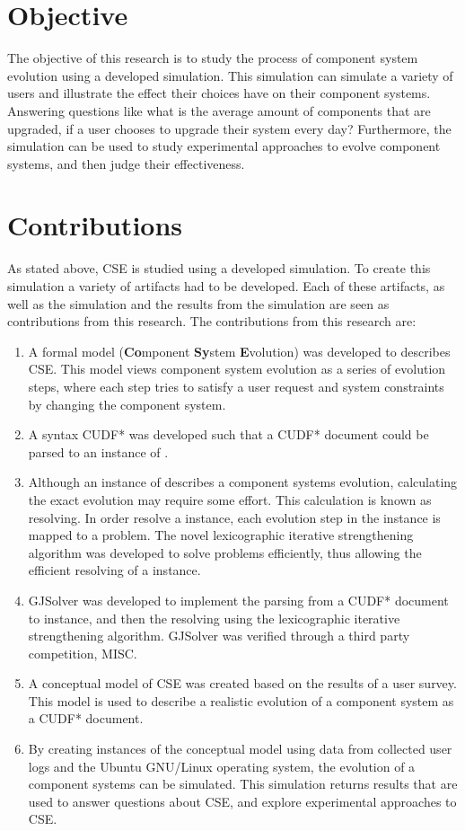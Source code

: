 \section{Objective}
The objective of this research is to study the process of component system evolution using a developed simulation.
This simulation can simulate a variety of users and illustrate the effect their choices have on their component systems.
Answering questions like what is the average amount of components that are upgraded, if a user chooses to upgrade their system every day?
Furthermore, the simulation can be used to study experimental approaches to evolve component systems, and then judge their effectiveness.

\section{Contributions}
As stated above, CSE is studied using a developed simulation.
To create this simulation a variety of artifacts had to be developed.
Each of these artifacts, as well as the simulation and the results from the simulation are seen as contributions from this research. 
The contributions from this research are:
\begin{enumerate}
  \item A formal model \modelname (\textbf{Co}mponent \textbf{Sy}stem \textbf{E}volution) was developed to describes CSE. 
  This model views component system evolution as a series of evolution steps, where each step tries to satisfy a user request and system constraints by changing the component system.
  \item A syntax CUDF* was developed such that a CUDF* document could be parsed to an instance of \modelname. 
  \item Although an instance of \modelname describes a component systems evolution, calculating the exact evolution may require some effort.
  This calculation is known as resolving.
  In order resolve a \modelname instance, each evolution step in the instance is mapped to a \modelimpl problem.
  The novel lexicographic iterative strengthening algorithm was developed to solve \modelimpl problems efficiently, thus allowing the efficient resolving of a \modelname instance.
  \item GJSolver was developed to implement the parsing from a CUDF* document to \modelname instance, and then the resolving using the lexicographic iterative strengthening algorithm.
  GJSolver was verified through a third party competition, MISC.
  \item A conceptual model of CSE was created based on the results of a user survey. 
  This model is used to describe a realistic evolution of a component system as a CUDF* document. 
  \item By creating instances of the conceptual model using data from collected user logs and the Ubuntu GNU/Linux operating system,
  the evolution of a component systems can be simulated.
  This simulation returns results that are used to answer questions about CSE, and explore experimental approaches to CSE.
\end{enumerate}


